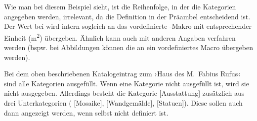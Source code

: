 \begin{bsp}
\end{bsp}
Wie man bei diesem Beispiel sieht, ist die Reihenfolge, in der die Kategorien
 angegeben werden, irrelevant, da die Definition in der Präambel entscheidend ist.
Der Wert bei  wird intern sogleich an das vordefinierte -Makro mit entsprechender Einheit (\si{\meter\squared}) übergeben.
Ähnlich kann auch mit anderen Angaben verfahren werden (bspw. bei Abbildungen können die  an ein vordefiniertes Macro  übergeben werden).

Bei dem oben beschriebenen Katalogeintrag zum 
›Haus des M.~Fabius Rufus‹ sind alle Kategorien ausgefüllt. 
Wenn eine Kategorie nicht ausgefüllt ist, wird sie nicht ausgegeben.
Allerdings besteht die Kategorie  [Ausstattung]  zusätzlich aus drei Unterkategorien 
( [Mosaike],  [Wandgemälde],  [Statuen]).
Diese sollen auch dann angezeigt werden, wenn  selbst nicht definiert ist.


